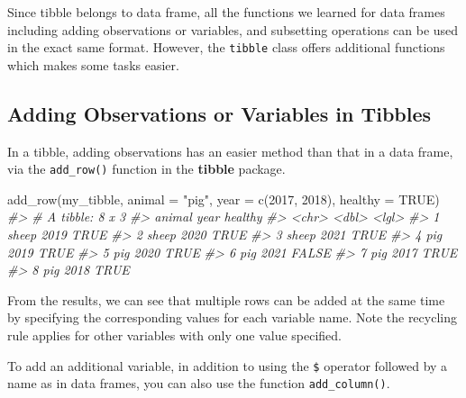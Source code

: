 \documentclass[
]{book}
\newenvironment{Shaded}{\begin{snugshade}}{\end{snugshade}}
\newcommand{\AttributeTok}[1]{\textcolor[rgb]{0.77,0.63,0.00}{#1}}
\newcommand{\CommentTok}[1]{\textcolor[rgb]{0.56,0.35,0.01}{\textit{#1}}}
\newcommand{\ConstantTok}[1]{\textcolor[rgb]{0.00,0.00,0.00}{#1}}
\newcommand{\DecValTok}[1]{\textcolor[rgb]{0.00,0.00,0.81}{#1}}
\newcommand{\FunctionTok}[1]{\textcolor[rgb]{0.00,0.00,0.00}{#1}}
\newcommand{\NormalTok}[1]{#1}
\newcommand{\StringTok}[1]{\textcolor[rgb]{0.31,0.60,0.02}{#1}}
\begin{document}
Since tibble belongs to data frame, all the functions we learned for data frames including adding observations or variables, and subsetting operations can be used in the exact same format. However, the \texttt{tibble} class offers additional functions which makes some tasks easier.

\hypertarget{adding-observations-or-variables-in-tibbles}{%
\subsection{Adding Observations or Variables in Tibbles}\label{adding-observations-or-variables-in-tibbles}}

In a tibble, adding observations has an easier method than that in a data frame, via the \texttt{add\_row()} function in the \textbf{tibble} package.

\begin{Shaded}
\begin{Highlighting}[]
\FunctionTok{add\_row}\NormalTok{(my\_tibble, }\AttributeTok{animal =} \StringTok{"pig"}\NormalTok{, }\AttributeTok{year =} \FunctionTok{c}\NormalTok{(}\DecValTok{2017}\NormalTok{, }\DecValTok{2018}\NormalTok{), }\AttributeTok{healthy =} \ConstantTok{TRUE}\NormalTok{)}
\CommentTok{\#\textgreater{} \# A tibble: 8 x 3}
\CommentTok{\#\textgreater{}   animal  year healthy}
\CommentTok{\#\textgreater{}   \textless{}chr\textgreater{}  \textless{}dbl\textgreater{} \textless{}lgl\textgreater{}  }
\CommentTok{\#\textgreater{} 1 sheep   2019 TRUE   }
\CommentTok{\#\textgreater{} 2 sheep   2020 TRUE   }
\CommentTok{\#\textgreater{} 3 sheep   2021 TRUE   }
\CommentTok{\#\textgreater{} 4 pig     2019 TRUE   }
\CommentTok{\#\textgreater{} 5 pig     2020 TRUE   }
\CommentTok{\#\textgreater{} 6 pig     2021 FALSE  }
\CommentTok{\#\textgreater{} 7 pig     2017 TRUE   }
\CommentTok{\#\textgreater{} 8 pig     2018 TRUE}
\end{Highlighting}
\end{Shaded}

From the results, we can see that multiple rows can be added at the same time by specifying the corresponding values for each variable name. Note the recycling rule applies for other variables with only one value specified.

To add an additional variable, in addition to using the \texttt{\$} operator followed by a name as in data frames, you can also use the function \texttt{add\_column()}.
\end{document}
